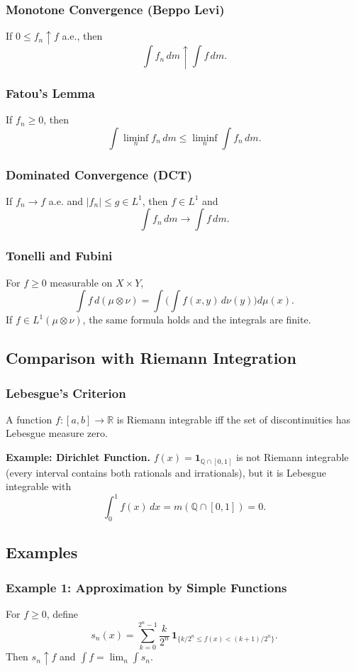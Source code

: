 \subsubsection*{Monotone Convergence (Beppo Levi)}
If $0 \le f_n \uparrow f$ a.e., then
\[
\int f_n \, dm \uparrow \int f \, dm.
\]

\subsubsection*{Fatou's Lemma}
If $f_n \ge 0$, then
\[
\int \liminf_n f_n \, dm \le \liminf_n \int f_n \, dm.
\]

\subsubsection*{Dominated Convergence (DCT)}
If $f_n \to f$ a.e. and $|f_n| \le g \in L^1$, then $f \in L^1$ and
\[
\int f_n \, dm \to \int f \, dm.
\]

\subsubsection*{Tonelli and Fubini}
For $f \ge 0$ measurable on $X \times Y$,
\[
\int f \, d(\mu \otimes \nu) = \int \!\Big(\int f(x,y)\,d\nu(y)\Big)d\mu(x).
\]
If $f \in L^1(\mu \otimes \nu)$, the same formula holds and the integrals are finite.

\subsection*{Comparison with Riemann Integration}
\subsubsection*{Lebesgue's Criterion}
A function $f:[a,b]\to \mathbb{R}$ is Riemann integrable iff the set of discontinuities has Lebesgue measure zero.

\textbf{Example: Dirichlet Function.} 
$f(x) = \mathbf{1}_{\mathbb{Q} \cap [0,1]}$ is not Riemann integrable (every interval contains both rationals and irrationals), but it is Lebesgue integrable with
\[
\int_0^1 f(x)\,dx = m(\mathbb{Q} \cap [0,1]) = 0.
\]

\subsection{Examples}

\subsubsection*{Example 1: Approximation by Simple Functions}
For $f \ge 0$, define
\[
s_n(x) = \sum_{k=0}^{2^n-1} \frac{k}{2^n}\, \mathbf{1}_{\{k/2^n \le f(x) < (k+1)/2^n\}}.
\]
Then $s_n \uparrow f$ and $\int f = \lim_n \int s_n$.

